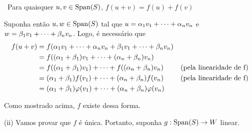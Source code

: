 \documentclass[11pt,reqno,a4paper]{amsart}
\begin{document}
\textbullet\ Para quaisquer $u,v \in \mathrm{Span}(S)$, $f(u + v) = f(u) + f(v)$

Suponha então $u,w \in \mathrm{Span}(S)$ tal que $u = \comblin$ e $w = \comblin[\beta]$. Logo, é necessário que
\begin{align*}
    f(u+v) &= f(\comblin + \comblin[\beta])\\
    &= f((\alpha_1 + \beta_1) v_1 + \dots + (\alpha_n + \beta_n) v_n)\\
    &= f((\alpha_1 + \beta_1) v_1) + \dots + f((\alpha_n + \beta_n) v_n) &\text{(pela linearidade de f)}\\
    &= (\alpha_1 + \beta_1) f(v_1) + \dots + (\alpha_n + \beta_n) f(v_n) &\text{(pela linearidade de f)}\\
    &= (\alpha_1 + \beta_1) \varphi (v_1) + \dots + (\alpha_n + \beta_n) \varphi (v_n)
\end{align*}

Como mostrado acima, $f$ existe dessa forma.

\hrulefill

(ii) Vamos provar que $f$ é única. Portanto, suponha $g: \mathrm{Span}(S) \to W$ linear.




\endgroup
\end{document}
